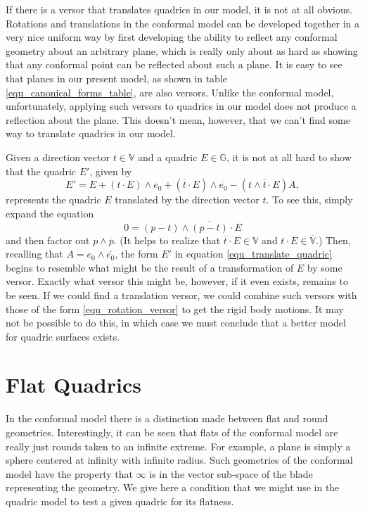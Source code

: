 \documentclass{birkjour}
\theoremstyle{definition}
\theoremstyle{remark}
\numberwithin{equation}{section}
\newcommand{\G}{\mathbb{G}}
\newcommand{\V}{\mathbb{V}}
\newcommand{\Alpha}{A}
\begin{document}
If there is a versor that translates quadrics in our model, it is not at all obvious.
Rotations and translations in the conformal model can be developed together in
a very nice uniform way by first developing the ability to reflect any conformal
geometry about an arbitrary plane, which is really only about as hard as showing
that any conformal point can be reflected about such a plane.
It is easy to see that planes in our present model, as shown
in table \eqref{equ_canonical_forms_table}, are also versors.  Unlike the conformal
model, unfortunately, applying such versors to quadrics in our model does not
produce a reflection about the plane.  This doesn't mean, however, that we can't
find some way to translate quadrics in our model.

Given a direction vector $t\in\V$ and a quadric $E\in\G$, it is not at all hard
to show that the quadric $E'$, given by
\begin{equation}\label{equ_translate_quadric}
E' = E + (t\cdot E)\wedge e_0 + (\overline{t}\cdot E)\wedge\overline{e_0}
- (t\wedge\overline{t}\cdot E)\Alpha,
\end{equation}
represents the quadric $E$ translated by the direction vector $t$.  To see this,
simply expand the equation
\begin{equation}
0 = (p-t)\wedge\overline{(p-t)}\cdot E
\end{equation}
and then factor out $p\wedge\overline{p}$.
(It helps to realize that $\overline{t}\cdot E\in\V$ and $t\cdot E\in\overline{\V}$.)
Then, recalling
that $\Alpha=e_0\wedge\overline{e_0}$, the form $E'$ in equation \eqref{equ_translate_quadric}
begins to resemble what might be the result of a transformation of $E$ by some versor.
Exactly what versor this might be, however, if it even exists, remains to be seen.
If we could find a translation versor, we could combine such versors with
those of the form \eqref{equ_rotation_versor} to get the rigid body motions.
It may not be possible to do this, in which case we must conclude that
a better model for quadric surfaces exists.

\section{Flat Quadrics}

In the conformal model there is a distinction made between flat and round
geometries.  Interestingly, it can be seen that flats of the conformal model
are really just rounds taken to an infinite extreme.  For example, a plane
is simply a sphere centered at infinity with infinite radius.  Such geometries
of the conformal model have the property that $\infty$ is in the vector
sub-space of the blade representing the geometry.  We give here a
condition that we might use in the quadric model to test a given quadric
for its flatness.
\end{document}
